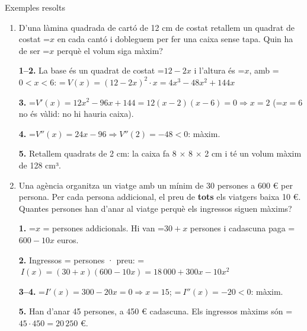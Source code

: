 \documentclass[11pt,a4paper]{article}
\newcommand{\lt}{<}\newcommand{\gt}{>}
\newcommand{\fmm}[1]{\setbox0=\hbox{$#1$}\ifdim\wd0>\linewidth\[#1\]\else\mbox{\box0}\fi}
\begin{document}
\begin{fmex}{Exemples resolts}
\begin{enumerate}[label=\textbf{\arabic*.},leftmargin=*]
            

\textbf{1.} \fmm{x} = costats perpendiculars al riu, \fmm{y} = costat para\lgem{}el. Tanca: \fmm{2x+y=400\Rightarrow y=400-2x}, \fmm{\ 0\lt x\lt200}.

            

\textbf{2.} \fmm{A=x\cdot y\Rightarrow A(x)=x(400-2x)=400x-2x^2}

            

\textbf{3--4.} \fmm{A'(x)=400-4x=0\Rightarrow x=100}; \fmm{\ A''(x)=-4\lt0}: màxim.

            

\textbf{5.} \fmm{x=100} m i \fmm{y=200} m. L'àrea màxima és 20 000 m².
\item D'una làmina quadrada de cartó de 12 cm de costat retallem un quadrat de costat \fmm{x} en cada cantó i dobleguem per fer una caixa sense tapa. Quin ha de ser \fmm{x} perquè el volum siga màxim?
          

            

\textbf{1--2.} La base és un quadrat de costat \fmm{12-2x} i l'altura és \fmm{x}, amb \fmm{0\lt x\lt6}: \fmm{\ V(x)=(12-2x)^2\cdot x=4x^3-48x^2+144x}

            

\textbf{3.} \fmm{V'(x)=12x^2-96x+144=12(x-2)(x-6)=0\Rightarrow x=2} (\fmm{x=6} no és vàlid: no hi hauria caixa).

            

\textbf{4.} \fmm{V''(x)=24x-96\Rightarrow V''(2)=-48\lt0}: màxim.

            

\textbf{5.} Retallem quadrats de 2 cm: la caixa fa 8 $\times$ 8 $\times$ 2 cm i té un volum màxim de 128 cm³.
\item Una agència organitza un viatge amb un mínim de 30 persones a 600 € per persona. Per cada persona addicional, el preu de \textbf{tots} els viatgers baixa 10 €. Quantes persones han d'anar al viatge perquè els ingressos siguen màxims?
          

            

\textbf{1.} \fmm{x} = persones addicionals. Hi van \fmm{30+x} persones i cadascuna paga \fmm{600-10x} euros.

            

\textbf{2.} Ingressos = persones · preu: \fmm{\ I(x)=(30+x)(600-10x)=18\,000+300x-10x^2}

            

\textbf{3--4.} \fmm{I'(x)=300-20x=0\Rightarrow x=15}; \fmm{\ I''(x)=-20\lt0}: màxim.

            

\textbf{5.} Han d'anar 45 persones, a 450 € cadascuna. Els ingressos màxims són \fmm{45\cdot450=20\,250} €.
\end{enumerate}
\end{fmex}

  
\end{document}
